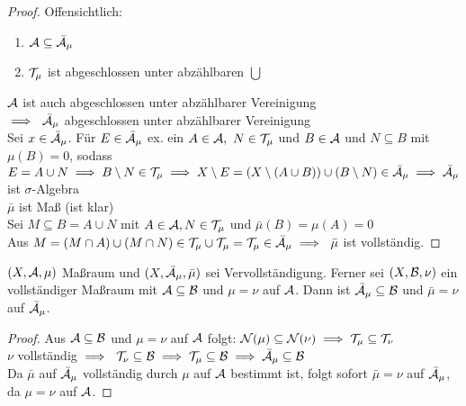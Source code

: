   \begin{proof}
    Offensichtlich:
    \begin{enumerate}
      \item $\mathcal{A} \subseteq \bar{\mathcal{A}}_{\mu}$
      \item $\mathcal{T}_{\mu}$ ist abgeschlossen unter abzählbaren $\bigcup$
    \end{enumerate}
    $\mathcal{A}$ ist auch abgeschlossen unter abzählbarer Vereinigung\\
    $\implies \ \bar{\mathcal{A}}_{\mu}$ abgeschlossen unter abzählbarer Vereinigung\\
    Sei $x \in \bar{\mathcal{A}}_{\mu}$. Für $E \in \bar{\mathcal{A}}_{\mu}$ ex. ein $A \in \mathcal{A}, \ N \in \mathcal{T}_{\mu}$ und $B \in \mathcal{A}$ und $N \subseteq B$ mit $\mu(B) = 0$, sodass $E = A \cup N \\ \implies B \setminus N \in \mathcal{T}_{\mu} \\ \implies X \setminus E = (X \setminus (A\cup B)) \cup (B \setminus N) \in \bar{\mathcal{A}}_{\mu} \\ \implies \bar{\mathcal{A}}_{\mu}$ ist $\sigma$-Algebra \\
    $\bar{\mu}$ ist Maß (ist klar)\\
    Sei $M \subseteq B = A \cup N$ mit $A \in \mathcal{A}, N \in \mathcal{T}_{\mu}$ und $\bar{\mu}(B) = \mu(A) = 0$ \\
    Aus $M = (M \cap A) \cup (M \cap N) \in \mathcal{T}_{\mu} \cup \mathcal{T}_{\mu} = \mathcal{T}_{\mu} \in \bar{\mathcal{A}}_{\mu} \\ \implies \ \bar{\mu}$ ist vollständig.  
  \end{proof}

  \begin{theorem}
    $(X, \mathcal{A}, \mu)$ Maßraum und $(X, \bar{\mathcal{A}}_{\mu}, \bar{\mu})$ sei Vervollständigung. Ferner sei $(X, \mathcal{B}, \nu)$ ein vollständiger Maßraum mit $\mathcal{A} \subseteq \mathcal{B}$ und $\mu = \nu$ auf $\mathcal{A}$. Dann ist $\bar{\mathcal{A}}_{\mu} \subseteq \mathcal{B}$ und $\bar{\mu} = \nu$ auf $\bar{\mathcal{A}}_{\mu}$. 
  \end{theorem}

  \begin{proof}
    Aus $\mathcal{A} \subseteq \mathcal{B}$ und $\mu = \nu$ auf $\mathcal{A}$ folgt: $\mathcal{N}(\mu) \subseteq \mathcal{N}(\nu) \implies \mathcal{T}_{\mu} \subseteq \mathcal{T}_{\nu}$\\
    $\nu$ vollständig $\implies \ \mathcal{T}_{\nu} \subseteq \mathcal{B} \implies \mathcal{T}_{\mu} \subseteq \mathcal{B} \implies \bar{\mathcal{A}}_{\mu} \subseteq \mathcal{B}$\\
    Da $\bar{\mu}$ auf $\bar{\mathcal{A}}_{\mu}$ vollständig durch $\mu$ auf $\mathcal{A}$ bestimmt ist, folgt sofort $\bar{\mu} = \nu$ auf $\bar{\mathcal{A}}_{\mu}$, da $\mu = \nu$ auf $\mathcal{A}$.
  \end{proof}

